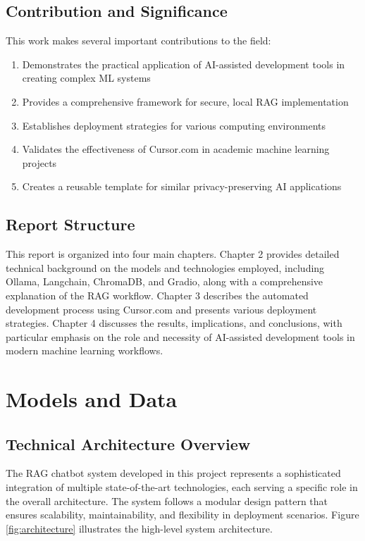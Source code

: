 \subsection{Contribution and Significance}

This work makes several important contributions to the field:

\begin{enumerate}
    \item Demonstrates the practical application of AI-assisted development tools in creating complex ML systems
    \item Provides a comprehensive framework for secure, local RAG implementation
    \item Establishes deployment strategies for various computing environments
    \item Validates the effectiveness of Cursor.com in academic machine learning projects
    \item Creates a reusable template for similar privacy-preserving AI applications
\end{enumerate}

\subsection{Report Structure}

This report is organized into four main chapters. Chapter 2 provides detailed technical background on the models and technologies employed, including Ollama, Langchain, ChromaDB, and Gradio, along with a comprehensive explanation of the RAG workflow. Chapter 3 describes the automated development process using Cursor.com and presents various deployment strategies. Chapter 4 discusses the results, implications, and conclusions, with particular emphasis on the role and necessity of AI-assisted development tools in modern machine learning workflows.

\newpage

\section{Models and Data}

\subsection{Technical Architecture Overview}

The RAG chatbot system developed in this project represents a sophisticated integration of multiple state-of-the-art technologies, each serving a specific role in the overall architecture. The system follows a modular design pattern that ensures scalability, maintainability, and flexibility in deployment scenarios. Figure \ref{fig:architecture} illustrates the high-level system architecture.

